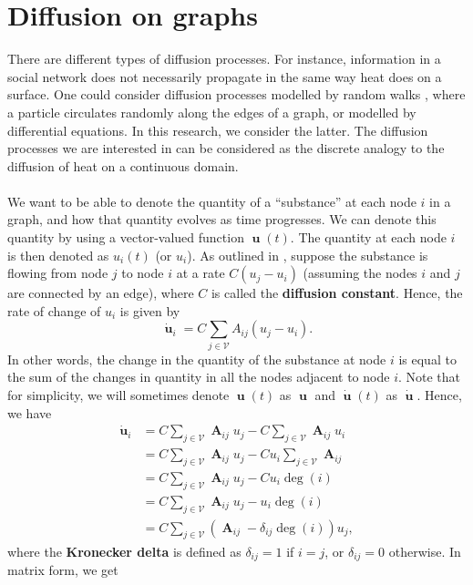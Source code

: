 \documentclass[12pt, oneside]{report}   	%
\DeclareMathOperator{\Adj}{\boldsymbol{A}}
\DeclareMathOperator{\uu}{\boldsymbol{u}}
\begin{document}
\section{Diffusion on graphs}
\label{sec:diffusion}


There are different types of diffusion processes. For instance, information in a social network does not necessarily propagate in the same way heat does on a surface. One could consider diffusion processes modelled by random walks \cite{blum2020foundations}, where a particle circulates randomly along the edges of a graph, or modelled by differential equations. In this research, we consider the latter. The diffusion processes we are interested in can be considered as the discrete analogy to the diffusion of heat on a continuous domain.\\\\
We want to be able to denote the quantity of a “substance” at each node $i$ in a graph, and how that quantity evolves as time progresses. We can denote this quantity by using a vector-valued function $\uu(t)$. The quantity at each node $i$ is then denoted as $u_i(t)$ (or $u_i$). As outlined in \cite{Newman2010}, suppose the substance is flowing from node $j$ to node $i$ at a rate $C(u_j - u_i)$ (assuming the nodes $i$ and $j$ are connected by an edge), where $C$ is called the \textbf{diffusion constant}. Hence, the rate of change of $u_i$ is given by
$$
\dot{\uu}_i = C\sum_{j\in\mathcal{V}} A_{ij}(u_j - u_i).
$$
In other words, the change in the quantity of the substance at node $i$ is equal to the sum of the changes in quantity in all the nodes adjacent to node $i$. Note that for simplicity, we will sometimes denote $\uu(t)$ as $\uu$ and $\dot{\uu}(t)$ as $\dot{\uu}$. Hence, we have
\begin{align*}
\dot{\uu}_i &= C\sum_{j\in\mathcal{V}} \Adj_{ij}u_j - C\sum_{j\in\mathcal{V}} \Adj_{ij}u_i \\
 &= C\sum_{j\in\mathcal{V}} \Adj_{ij}u_j - Cu_i\sum_{j\in\mathcal{V}} \Adj_{ij} \\
 &= C\sum_{j\in\mathcal{V}} \Adj_{ij}u_j - Cu_i\deg(i) \\
 &= C\sum_{j\in\mathcal{V}} \Adj_{ij}u_j - u_i\deg(i) \\
 &= C\sum_{j\in\mathcal{V}} (\Adj_{ij} - \delta_{ij}\deg(i))u_j,
\end{align*}
where the \textbf{Kronecker delta} is defined as $\delta_{ij}=1$ if $i=j$, or $\delta_{ij}=0$ otherwise. In matrix form, we get
\end{document}
